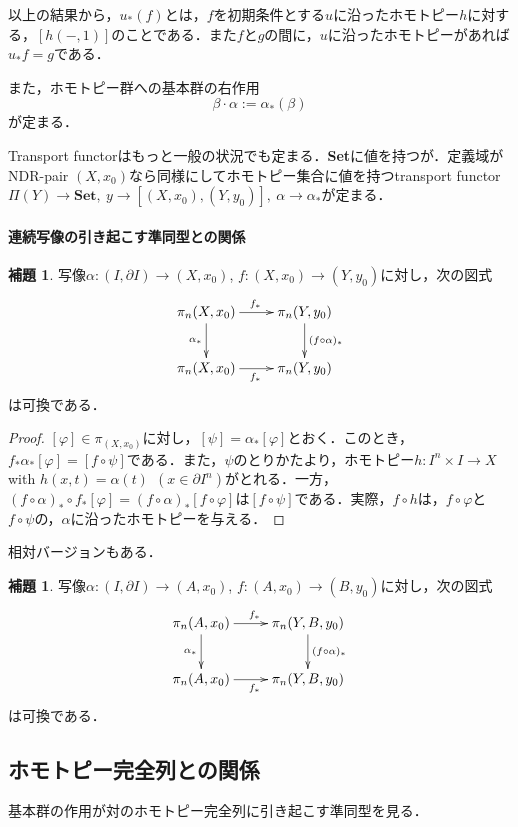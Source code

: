 \documentclass[a4paper,11pt]{jsarticle}
\theoremstyle{definition}
\newtheorem{lem}[thm]{補題}
\begin{document}
以上の結果から，$u_*(f)$とは，$f$を初期条件とする$u$に沿ったホモトピー$h$に対する，$[h(-,1)]$のことである．また$f$と$g$の間に，$u$に沿ったホモトピーがあれば$u_*f=g$である．

また，ホモトピー群への基本群の右作用
\[
  \beta\cdot\alpha:=\alpha_*(\beta)
\]が定まる．

Transport functorはもっと一般の状況でも定まる．\textbf{Set}に値を持つが．定義域がNDR-pair $(X,x_0)$なら同様にしてホモトピー集合に値を持つtransport functor $\Pi(Y)\to \mathbf{Set},\ y\to [(X,x_0),(Y,y_0)],\ \alpha\to \alpha_*$が定まる．

\paragraph{連続写像の引き起こす準同型との関係}
\begin{lem}
  写像$\alpha\colon (I,\partial I)\to (X,x_0)$, $f\colon (X,x_0)\to (Y,y_0)$に対し，次の図式
\[
  \xymatrix{
    \pi_n(X,x_0)\ar[r]^{f_*}\ar[d]_{\alpha_*}&\pi_n(Y,y_0)\ar[d]^{(f\circ \alpha)_*}\\
    \pi_n(X,x_0)\ar[r]_{f_*}&\pi_n(Y,y_0)
  }
\]
は可換である．
\end{lem}
\begin{proof}
  $[\varphi]\in\pi_(X,x_0)$に対し，$[\psi]=\alpha_*[\varphi]$とおく．このとき，$f_*\alpha_*[\varphi]=[f\circ \psi]$である．また，$\psi$のとりかたより，ホモトピー$h\colon I^{n}\times I\to X$ with $h(x,t)=\alpha(t)\ \ (x\in \partial I^n)$がとれる．一方，$(f\circ \alpha)_*\circ f_*[\varphi]=(f\circ \alpha)_*[f\circ \varphi]$は$[f\circ \psi]$である．実際，$f\circ h$は，$f\circ \varphi$と$f\circ \psi$の，$\alpha$に沿ったホモトピーを与える．
\end{proof}
相対バージョンもある．
\begin{lem}
  写像$\alpha\colon (I,\partial I)\to (A,x_0)$, $f\colon (A,x_0)\to (B,y_0)$に対し，次の図式
\[
  \xymatrix{
    \pi_n(A,x_0)\ar[r]^{f_*}\ar[d]_{\alpha_*}&\pi_n(Y,B,y_0)\ar[d]^{(f\circ \alpha)_*}\\
    \pi_n(A,x_0)\ar[r]_{f_*}&\pi_n(Y,B,y_0)
  }
\]
は可換である．
\end{lem}

\subsection{ホモトピー完全列との関係}
基本群の作用が対のホモトピー完全列に引き起こす準同型を見る．
\end{document}
